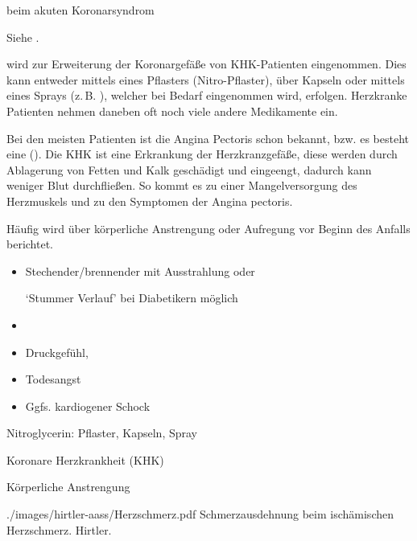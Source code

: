 {{\TxSAMPLER} beim akuten Koronarsyndrom}
{
\begin{SAMPLERText}
  \item[\SAMPLER{S}] Siehe {\TxABCDE}.
  \item[\SAMPLER{M}]  wird zur Erweiterung der
  Koronargefäße von KHK-Patienten eingenommen. Dies kann
  entweder mittels eines Pflasters (Nitro-Pflaster), über
  Kapseln oder mittels eines Sprays (z.\,B.
  ), welcher bei Bedarf
  eingenommen wird, erfolgen. 
  Herzkranke Patienten nehmen daneben oft noch viele andere Medikamente ein.
  \item[\SAMPLER{P}]
  Bei den meisten Patienten ist die Angina
  Pectoris schon bekannt, bzw. es besteht eine  (). Die KHK ist eine Erkrankung der
  Herzkranzgefäße, diese werden durch Ablagerung von Fetten
  und Kalk geschädigt und eingeengt, dadurch kann weniger Blut
  durchfließen. So kommt es zu einer Mangelversorgung des
  Herzmuskels und zu den Symptomen der Angina pectoris.
  \item[\SAMPLER{E}]
  Häufig wird über körperliche Anstrengung oder Aufregung
  vor Beginn des Anfalls berichtet.
\end{SAMPLERText}




}
{
\begin{SAMPLERSlide}
  \item[\SAMPLER{S}]
  \begin{itemize}
    \item Stechender/brennender  mit
    Ausstrahlung oder 
    
    \enquote*{Stummer Verlauf} bei Diabetikern möglich
    \item {}
    \item Druckgefühl, 
    \item Todesangst
    \item Ggfs. kardiogener Schock
  \end{itemize}
  \item[\SAMPLER{M}] Nitroglycerin: Pflaster, Kapseln, Spray
  \item[\SAMPLER{P}] Koronare Herzkrankheit (KHK)
  \item[\SAMPLER{E}] Körperliche Anstrengung
\end{SAMPLERSlide}
}
{./images/hirtler-aass/Herzschmerz.pdf}
{Schmerzausdehnung beim ischämischen
Herzschmerz.}
{Hirtler.}

